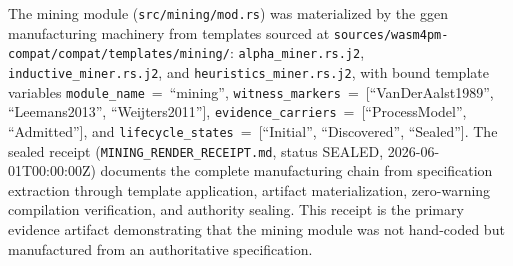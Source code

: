 The mining module (\texttt{src/mining/mod.rs}) was materialized by the ggen manufacturing
machinery from templates sourced at
\texttt{sources/wasm4pm-compat/compat/templates/mining/}: \texttt{alpha\_miner.rs.j2},
\texttt{inductive\_miner.rs.j2}, and \texttt{heuristics\_miner.rs.j2}, with bound template
variables \texttt{module\_name}~=~``mining'', \texttt{witness\_markers}~=~[``VanDerAalst1989'',
``Leemans2013'', ``Weijters2011''], \texttt{evidence\_carriers}~=~[``ProcessModel'',
``Admitted''], and \texttt{lifecycle\_states}~=~[``Initial'', ``Discovered'', ``Sealed''].
The sealed receipt (\texttt{MINING\_RENDER\_RECEIPT.md}, status SEALED,
2026-06-01T00:00:00Z) documents the complete manufacturing chain from specification extraction
through template application, artifact materialization, zero-warning compilation verification,
and authority sealing. This receipt is the primary evidence artifact demonstrating that the mining
module was not hand-coded but manufactured from an authoritative specification.
